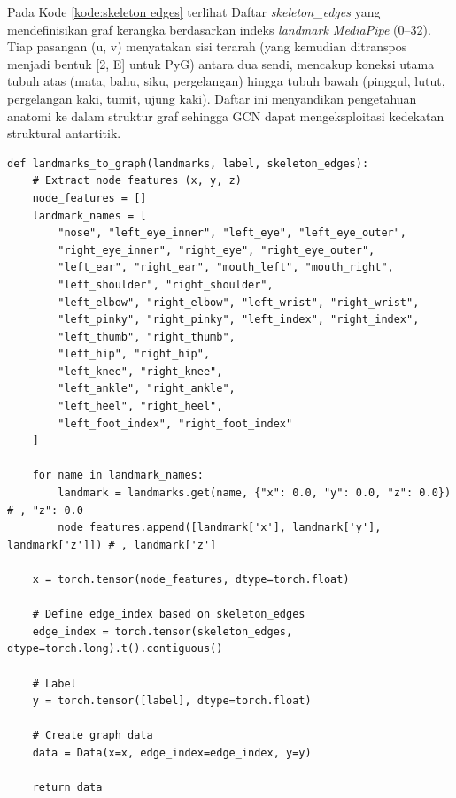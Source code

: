 Pada Kode \ref{kode:skeleton edges} terlihat Daftar \textit{skeleton\_edges} yang mendefinisikan graf kerangka berdasarkan indeks \textit{landmark MediaPipe} (0–32). Tiap pasangan (u, v) menyatakan sisi terarah (yang kemudian ditranspos menjadi bentuk [2, E] untuk PyG) antara dua sendi, mencakup koneksi utama tubuh atas (mata, bahu, siku, pergelangan) hingga tubuh bawah (pinggul, lutut, pergelangan kaki, tumit, ujung kaki). Daftar ini menyandikan pengetahuan anatomi ke dalam struktur graf sehingga GCN dapat mengeksploitasi kedekatan struktural antartitik. \par


\begin{lstlisting}[caption={konversi \textit{skeleton} ke graf}, label={kode:konversi skeleton graf}]
def landmarks_to_graph(landmarks, label, skeleton_edges):
    # Extract node features (x, y, z)
    node_features = []
    landmark_names = [
        "nose", "left_eye_inner", "left_eye", "left_eye_outer",
        "right_eye_inner", "right_eye", "right_eye_outer",
        "left_ear", "right_ear", "mouth_left", "mouth_right",
        "left_shoulder", "right_shoulder",
        "left_elbow", "right_elbow", "left_wrist", "right_wrist",
        "left_pinky", "right_pinky", "left_index", "right_index",
        "left_thumb", "right_thumb",
        "left_hip", "right_hip",
        "left_knee", "right_knee",
        "left_ankle", "right_ankle",
        "left_heel", "right_heel",
        "left_foot_index", "right_foot_index"
    ]
    
    for name in landmark_names:
        landmark = landmarks.get(name, {"x": 0.0, "y": 0.0, "z": 0.0}) # , "z": 0.0
        node_features.append([landmark['x'], landmark['y'], landmark['z']]) # , landmark['z']
    
    x = torch.tensor(node_features, dtype=torch.float)
    
    # Define edge_index based on skeleton_edges
    edge_index = torch.tensor(skeleton_edges, dtype=torch.long).t().contiguous()
    
    # Label
    y = torch.tensor([label], dtype=torch.float)
    
    # Create graph data
    data = Data(x=x, edge_index=edge_index, y=y)
    
    return data
\end{lstlisting}

